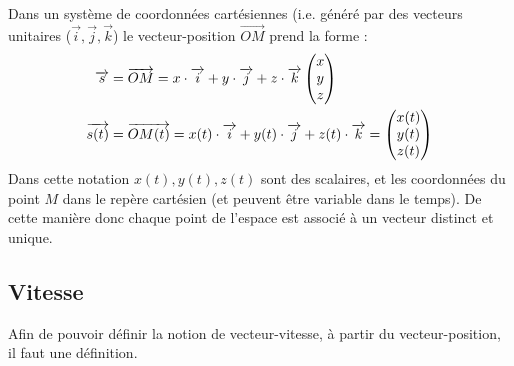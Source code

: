 \documentclass[11pt,a4paper]{article}
\begin{document}
\endgroup
\newpage
Dans un système de coordonnées cartésiennes (i.e. généré par des vecteurs unitaires ($\Vec{i}, \Vec{j}, \Vec{k}$) le vecteur-position $\overrightarrow{OM}$ prend la forme :
\begin{align*}
    \overrightarrow{s} &= \overrightarrow{OM} = x\cdot \overrightarrow{i} + y\cdot\overrightarrow{j} + z\cdot\overrightarrow{k}  
    \begin{pmatrix} x \\ y \\ z \end{pmatrix} \\
    \overrightarrow{s(t)} &= \overrightarrow{OM(t)} = x(t)\cdot \overrightarrow{i} + y(t)\cdot\overrightarrow{j} + z(t)\cdot\overrightarrow{k} = 
    \begin{pmatrix} x(t) \\ y(t) \\ z(t) \end{pmatrix} \\
\end{align*}
Dans cette notation $x(t), y(t), z(t)$ sont des scalaires, et les coordonnées du point $M$ dans le repère cartésien (et peuvent être variable dans le temps). 
De cette manière donc chaque point de l'espace est associé à un vecteur distinct et unique. 

\subsection{Vitesse}
Afin de pouvoir définir la notion de vecteur-vitesse, à partir du vecteur-position, il faut une définition. 
\end{document}
